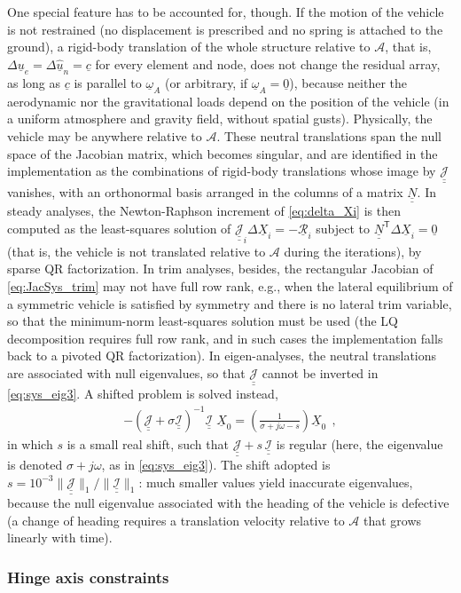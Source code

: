 \documentclass[12pt,a4paper,oneside,english]{abntex2} %
\newcommand{\fix}[1]{{\color{red}#1}}
\newcommand{\vect}[1]{\underline{#1}}
\def\tens#1{\underline{\underline{#1}}}
\def\lp{\left(}
\def\rp{\right)}
\def\T{\mathsf{T}}
\def\A{\mathcal{A}}
\def\u{\vect{u}}
\def\uhat{\widehat{\u}}
\def\omA{\vect{\omega}_A}
\def\zv{\vect{0}}
\def\ue{\u_e}
\def\X{\vect{X}}
\def\Xi{\X_i}
\def\Xz{\X_0}
\def\Resi{\vect{\mathcal{R}}_i}
\def\JacSys{\tens{\mathcal{J}}}
\def\JacSysi{\JacSys_i}
\def\MassSys{\tens{\mathcal{I}}}
\begin{document}
\fix{
One special feature has to be accounted for, though. If the motion of the vehicle is not restrained (no displacement is prescribed and no spring is attached to the ground), a rigid-body translation of the whole structure relative to $\A$, that is, $\Delta\ue=\Delta\uhat_n=\vect{c}$ for every element and node, does not change the residual array, as long as $\vect{c}$ is parallel to $\omA$ (or arbitrary, if $\omA=\zv$), because neither the aerodynamic nor the gravitational loads depend on the position of the vehicle (in a uniform atmosphere and gravity field, without spatial gusts). Physically, the vehicle may be anywhere relative to $\A$. These neutral translations span the null space of the Jacobian matrix, which becomes singular, and are identified in the implementation as the combinations of rigid-body translations whose image by $\JacSys$ vanishes, with an orthonormal basis arranged in the columns of a matrix $\tens{N}$. In steady analyses, the Newton-Raphson increment of \cref{eq:delta_Xi} is then computed as the least-squares solution of $\JacSysi\Delta\Xi=-\Resi$ subject to $\tens{N}^\T\Delta\Xi=\zv$ (that is, the vehicle is not translated relative to $\A$ during the iterations), by sparse QR factorization. In trim analyses, besides, the rectangular Jacobian of \cref{eq:JacSys_trim} may not have full row rank, e.g., when the lateral equilibrium of a symmetric vehicle is satisfied by symmetry and there is no lateral trim variable, so that the minimum-norm least-squares solution must be used (the LQ decomposition requires full row rank, and in such cases the implementation falls back to a pivoted QR factorization). In eigen-analyses, the neutral translations are associated with null eigenvalues, so that $\JacSys$ cannot be inverted in \cref{eq:sys_eig3}. A shifted problem is solved instead,
\begin{align}
    -\lp\JacSys+\sigma\MassSys\rp^{-1}\MassSys\;\Xz = \lp\frac{1}{\sigma+j\omega-s}\rp\Xz \ \ ,
    \label{eq:sys_eig_shift}
\end{align}
in which $s$ is a small real shift, such that $\JacSys+s\,\MassSys$ is regular (here, the eigenvalue is denoted $\sigma+j\omega$, as in \cref{eq:sys_eig3}). The shift adopted is $s=10^{-3}\lVert\JacSys\rVert_1/\lVert\MassSys\rVert_1$: much smaller values yield inaccurate eigenvalues, because the null eigenvalue associated with the heading of the vehicle is defective (a change of heading requires a translation velocity relative to $\A$ that grows linearly with time).
}

\subsubsection{Hinge axis constraints}
\label{sec:fem_hinge_constraint}
\end{document}
